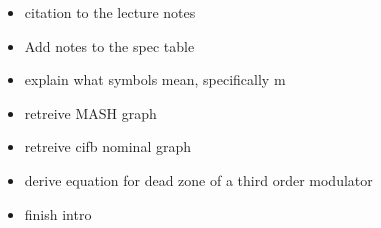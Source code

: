 \begin{itemize}
    \item citation to the lecture notes
    \item Add notes to the spec table
    \item explain what symbols mean, specifically m
    \item retreive MASH graph
    \item retreive cifb nominal graph
    \item derive equation for dead zone of a third order modulator
    \item finish intro
\end{itemize}
